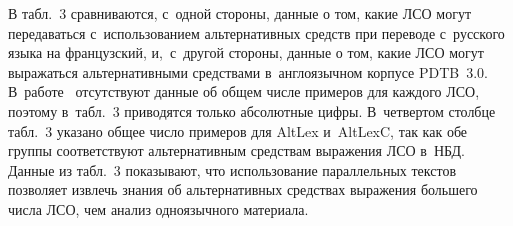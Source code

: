 \begin{multicols}{2}
{}


В табл.~3 сравниваются, с~одной стороны, данные о том, какие ЛСО могут 
передаваться с~использованием альтернативных средств при переводе 
с~русского языка на французский, и,~с~другой стороны, данные о том, какие 
ЛСО могут выражаться альтернативными средствами в~англоязычном 
корпусе PDTB~3.0. В~работе~\cite{14-in} отсутствуют данные об общем 
числе примеров для каждого ЛСО, поэтому в~табл.~3 приводятся только 
абсолютные цифры. В~четвертом столбце табл.~3 указано общее число 
примеров для AltLex и~AltLexC, так как обе группы соответствуют 
альтернативным средствам выражения ЛСО в~НБД. Данные из табл.~3 
показывают, что использование параллельных текстов позволяет извлечь 
знания об альтернативных средствах выражения большего числа ЛСО, чем 
анализ одноязычного материала.

\begin{table*}\small %
\begin{center}
\vspace*{2ex}


\end{center}
\end{table*}
\end{multicols}
